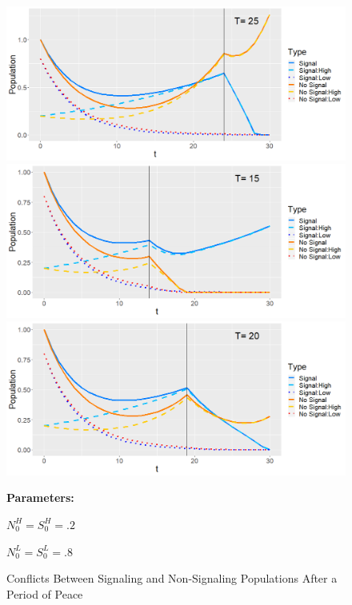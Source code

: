 \begin{figure}[p]
  \caption{Conflicts Between Signaling and Non-Signaling Populations After a Period of Peace}
   \label{fig:Fight}
    \includegraphics[width=\textwidth, height=.28\textheight]{Images/Fight_NS_Win.png}
    \includegraphics[width=\textwidth, height=.28\textheight]{Images/Fight_S_Win.png}
    \includegraphics[width=\textwidth, height=.28\textheight]{Images/Fight_Special.png}
 \begin{minipage}[c]{.2\textwidth}
    \textbf{Parameters:}
    \end{minipage}\hfill
    \begin{minipage}[c]{.2\textwidth}
    
    $N_0^H = S_0^H = .2$
    
    $N_0^L = S_0^L = .8$
    

\end{minipage}
\end{figure}
